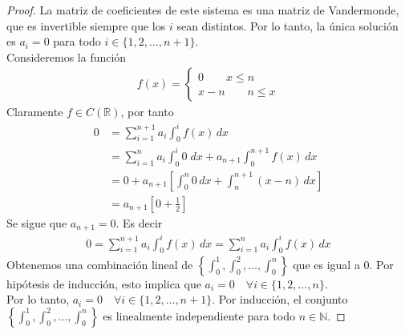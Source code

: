 \documentclass[11pt,letterpaper]{article}
\newcommand{\R}{\mathbb{R}}
\newcommand{\N}{\mathbb{N}}
\begin{document}
\begin{proof}
    La matriz de coeficientes de este sistema es una matriz de Vandermonde, que es invertible siempre que los $i$ sean distintos. 
    Por lo tanto, la única solución es $a_i = 0$ para todo $i \in \{1, 2, \dots, n+1\}$.\\ [10pt]
    Consideremos la función
    \begin{align*}
        f(x)=
        \begin{cases}
            0 \quad \quad x\leq n\\
            x-n \quad  \quad n\leq x
        \end{cases}
    \end{align*}
    Claramente $f\in C(\R)$, por tanto
    \begin{align*}
        0&=\sum_{i=1}^{n+1} a_i \int_0^i f(x) \, dx \\
        &= \sum_{i=1}^{n} a_i \int_0^i 0 \; dx + a_{n+1}\int_0^{n+1}f(x) \, dx\\
        &=0+a_{n+1} \left[\int_0^n 0 \, dx + \int_n^{n+1} (x-n) \, dx\right] \\
        &=a_{n+1}\left[0+\frac{1}{2}\right]
    \end{align*}
    Se sigue que $a_{n+1}=0$. Es decir 
    \begin{align*}
        0=\sum_{i=1}^{n+1} a_i \int_0^i f(x) \, dx=\sum_{i=1}^{n} a_i \int_0^i f(x) \, dx
    \end{align*}
    Obtenemos una combinación lineal de $\left\{ \int_0^1, \int_0^2, \dots, \int_0^n \right\}$ 
    que es igual a $0$. Por hipótesis de inducción, esto implica que $a_i = 0 \quad \forall i \in \{1, 2, \dots, n\}$.\\ [10pt]
    Por lo tanto, $a_i = 0 \quad \forall i \in \{1, 2, \dots, n+1\}$.
    Por inducción, el conjunto $\left\{ \int_0^1, \int_0^2, \dots, \int_0^n \right\}$ es linealmente independiente para todo $n \in \N$.
\end{proof}
\end{document}
